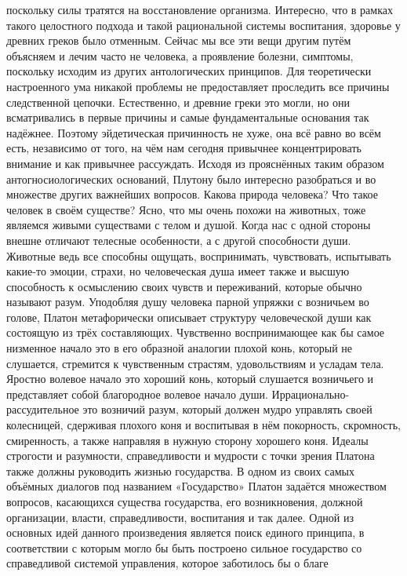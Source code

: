 поскольку силы тратятся на восстановление организма. Интересно, что в рамках
такого целостного подхода и такой рациональной системы воспитания, здоровье у
древних греков было отменным. Сейчас мы все эти вещи другим путём объясняем и
лечим часто не человека, а проявление болезни, симптомы, поскольку исходим из
других антологических принципов. Для теоретически настроенного ума никакой
проблемы не предоставляет проследить все причины следственной цепочки.
Естественно, и древние греки это могли, но они всматривались в первые причины и
самые фундаментальные основания так надёжнее. Поэтому эйдетическая причинность
не хуже, она всё равно во всём есть, независимо от того, на чём нам сегодня
привычнее концентрировать внимание и как привычнее рассуждать. Исходя из
прояснённых таким образом антогносиологических оснований, Плутону было интересно
разобраться и во множестве других важнейших вопросов. Какова природа человека?
Что такое человек в своём существе? Ясно, что мы очень похожи на животных, тоже
являемся живыми существами с телом и душой. Когда нас с одной стороны внешне
отличают телесные особенности, а с другой способности души. Животные ведь все
способны ощущать, воспринимать, чувствовать, испытывать какие-то эмоции, страхи,
но человеческая душа имеет также и высшую способность к осмыслению своих чувств
и переживаний, которые обычно называют разум. Уподобляя душу человека парной
упряжки с возничьем во голове, Платон метафорически описывает структуру
человеческой души как состоящую из трёх составляющих. Чувственно воспринимающее
как бы самое низменное начало это в его образной аналогии плохой конь, который
не слушается, стремится к чувственным страстям, удовольствиям и усладам тела.
Яростно волевое начало это хороший конь, который слушается возничьего и
представляет собой благородное волевое начало души. Иррационально-рассудительное
это возничий разум, который должен мудро управлять своей колесницей, сдерживая
плохого коня и воспитывая в нём покорность, скромность, смиренность, а также
направляя в нужную сторону хорошего коня. Идеалы строгости и разумности,
справедливости и мудрости с точки зрения Платона также должны руководить жизнью
государства. В одном из своих самых объёмных диалогов под названием
«Государство» Платон задаётся множеством вопросов, касающихся существа
государства, его возникновения, должной организации, власти, справедливости,
воспитания и так далее. Одной из основных идей данного произведения является
поиск единого принципа, в соответствии с которым могло бы быть построено сильное
государство со справедливой системой управления, которое заботилось бы о благе
